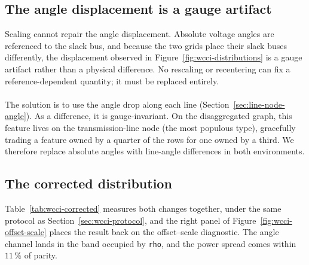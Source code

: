 \subsection{The angle displacement is a gauge artifact}
\label{sec:wcci-angle-representation}

Scaling cannot repair the angle displacement. Absolute voltage angles are referenced to the slack bus, and because the two grids place their slack buses differently, the displacement observed in Figure~\ref{fig:wcci-distributions} is a gauge artifact rather than a physical difference. No rescaling or recentering can fix a reference-dependent quantity; it must be replaced entirely.
\\
\\
The solution is to use the angle drop along each line (Section~\ref{sec:line-node-angle}). As a difference, it is gauge-invariant. On the disaggregated graph, this feature lives on the transmission-line node (the most populous type), gracefully trading a feature owned by a quarter of the rows for one owned by a third. We therefore replace absolute angles with line-angle differences in both environments.

\subsection{The corrected distribution}
\label{sec:wcci-corrected}

Table~\ref{tab:wcci-corrected} measures both changes together, under the same
protocol as Section~\ref{sec:wcci-protocol}, and the right panel of
Figure~\ref{fig:wcci-offset-scale} places the result back on the offset--scale
diagnostic. The angle channel lands in the band occupied by \texttt{rho}, and
the power spread comes within $11\,\%$ of parity.

